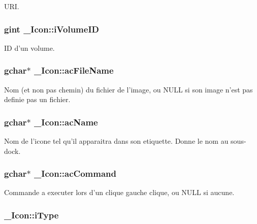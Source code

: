 URI. 

\subsubsection{\setlength{\rightskip}{0pt plus 5cm}gint {\bf \_\-Icon::iVolumeID}}\label{struct__Icon_31acfb1df65427e5626368b2939dc1c2}


ID d'un volume. 

\subsubsection{\setlength{\rightskip}{0pt plus 5cm}gchar$\ast$ {\bf \_\-Icon::acFileName}}\label{struct__Icon_9f3d2853306114af7e4c9c9c3e33f602}


Nom (et non pas chemin) du fichier de l'image, ou NULL si son image n'est pas definie pas un fichier. 

\subsubsection{\setlength{\rightskip}{0pt plus 5cm}gchar$\ast$ {\bf \_\-Icon::acName}}\label{struct__Icon_be3795ee26a0889b47b39d66ebcf6c92}


Nom de l'icone tel qu'il apparaitra dans son etiquette. Donne le nom au sous-dock. 

\subsubsection{\setlength{\rightskip}{0pt plus 5cm}gchar$\ast$ {\bf \_\-Icon::acCommand}}\label{struct__Icon_ea6bb47883982b1378c7b4bdb0d3e9e9}


Commande a executer lors d'un clique gauche clique, ou NULL si aucune. 

\subsubsection{ {\bf \_\-Icon::iType}}\label{struct__Icon_9132f1d3d214167300aa91d88fb34fed}



